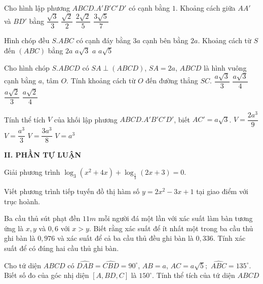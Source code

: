 \begin{ex}
Cho hình lập phương $ABCD. A'B'C'D'$ có cạnh bằng $1$. Khoảng cách giữa $AA'$ và $BD'$ bằng
\choice
{$\dfrac{\sqrt{3}}{3}$}
{$\dfrac{\sqrt{2}}{2}$}
{$\dfrac{2\sqrt{2}}{5}$}
{$\dfrac{3\sqrt{5}}{7}$}
\end{ex}
\begin{ex}
Hình chóp đều $S.ABC$ có cạnh đáy bằng $3a$ cạnh bên bằng $2a$. Khoảng cách từ $S$ đến $(ABC)$ bằng
\choice
{$2a$}
{$a\sqrt{3}$}
{$a$}
{$a\sqrt{5}$}
\end{ex}
\begin{ex}
Cho hình chóp $S.ABCD$ có $SA\perp (ABCD)$, $SA=2a$, $ABCD$ là hình vuông cạnh bằng $a$, tâm $O$. Tính khoảng cách từ $O$ đến đường thẳng $SC$.
\choice
{$\dfrac{a\sqrt{3}}{3}$}
{$\dfrac{a\sqrt{3}}{4}$}
{$\dfrac{a\sqrt{2}}{3}$}
{$\dfrac{a\sqrt{2}}{4}$}
\end{ex}
\begin{ex}
Tính thể tích $V$ của khối lập phương $ABCD.A'B'C'D'$, biết $AC'=a\sqrt{3}$.
\choice
{$V=\dfrac{2a^3}{9}$}
{$V=\dfrac{a^3}{3}$}
{$V=\dfrac{3a^3}{8}$}
{$V=a^3$}
\end{ex}

\noindent\textbf{II. PHẦN TỰ LUẬN}
\begin{ex} 
Giải phương trình $\log _3\left(x^2+4x\right)+\log_{\tfrac{1}{3}}(2x+3)=0$.
\end{ex}
\begin{ex}
Viết phương trình tiếp tuyến đồ thị hàm số $y=2x^2-3x+1$ tại giao điểm với trục hoành.
\end{ex}
\begin{ex}
Ba cầu thủ sút phạt đền $11m$ mỗi người đá một lần với xác suất làm bàn tương ứng là $x,y$ và $0,6$ với $x>y$. Biết rằng xác suất để ít nhất một trong ba cầu thủ ghi bàn là $0,976$ và xác suất để cả ba cầu thủ đều ghi bàn là $0,336$. Tính xác suất để có đúng hai cầu thủ ghi bàn. 
\end{ex}
\begin{ex}
Cho tứ diện $ABCD$ có $\widehat{DAB}=\widehat{CBD}=90^\circ$, $AB=a$, $AC=a\sqrt{5};$ $\widehat{ABC}=135^\circ$. Biết số đo của góc nhị diện $\left[A, BD, C\right]$ là $150^\circ $. Tính thể tích của tứ diện $ABCD$
\end{ex}
